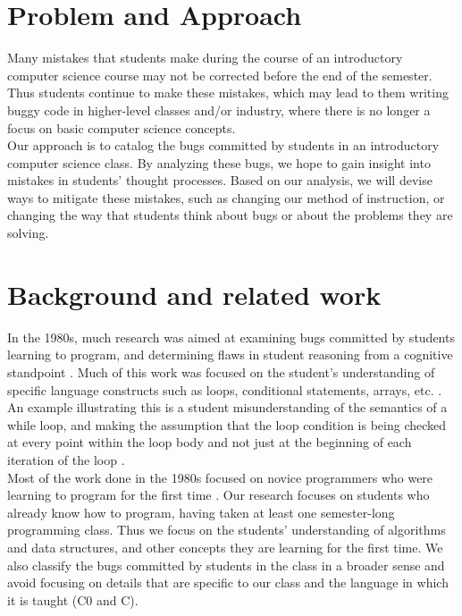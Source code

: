 \documentclass{sig-alternate}
\begin{document}
\section{Problem and Approach}
Many mistakes that students make during the course of an introductory computer science course may not be corrected before the end of the semester. Thus students continue to make these mistakes, which may lead to them writing buggy code in higher-level classes and/or industry, where there is no longer a focus on basic computer science concepts.\\

Our approach is to catalog the bugs committed by students in an introductory computer science class. By analyzing these bugs, we hope to gain insight into mistakes in students' thought processes. Based on our analysis, we will devise ways to mitigate these mistakes, such as changing our method of instruction, or changing the way that students think about bugs or about the problems they are solving.

\section{Background and related work}
\label{sec:background}

In the 1980s, much research was aimed at examining bugs committed by students learning to program, and determining flaws in student reasoning from a cognitive standpoint \cite{JoniSolowayGoldmanEhrlich83, PutnamSleemanBaxterKuspa86, SpohrerSoloway86, Pea86}. Much of this work was focused on the student's understanding of specific language constructs such as loops, conditional statements, arrays, etc. \cite{JoniSolowayGoldmanEhrlich83, PutnamSleemanBaxterKuspa86, Pea86}. An example illustrating this is a student misunderstanding of the semantics of a while loop, and making the assumption that the loop condition is being checked at every point within the loop body and not just at the beginning of each iteration of the loop \cite{Pea86}.\\

Most of the work done in the 1980s focused on novice programmers who were learning to program for the first time \cite{SpohrerSoloway86, Pea86}. Our research focuses on students who already know how to program, having taken at least one semester-long programming class. Thus we focus on the students' understanding of algorithms and data structures, and other concepts they are learning for the first time. We also classify the bugs committed by students in the class in a broader sense and avoid focusing on details that are specific to our class and the language in which it is taught (C0 and C).\\
\end{document}
